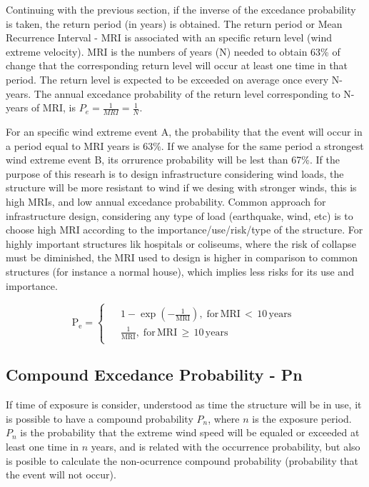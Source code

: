 \documentclass[12pt,twoside]{reedthesis}
\begin{document}
Continuing with the previous section, if the inverse of the excedance probability is taken, the return period (in years) is obtained. The return period or Mean Recurrence Interval - MRI is associated with an specific return level (wind extreme velocity). MRI is the numbers of years (N) needed to obtain 63\% of change that the corresponding return level will occur at least one time in that period. The return level is expected to be exceeded on average once every N-years. The annual excedance probability of the return level corresponding to N-years of MRI, is \(P_e=\frac{1}{MRI}=\frac{1}{N}\).

For an specific wind extreme event A, the probability that the event will occur in a period equal to MRI years is 63\%. If we analyse for the same period a strongest wind extreme event B, its orrurence probability will be lest than 67\%. If the purpose of this researh is to design infrastructure considering wind loads, the structure will be more resistant to wind if we desing with stronger winds, this is high MRIs, and low annual excedance probability. Common approach for infrastructure design, considering any type of load (earthquake, wind, etc) is to choose high MRI according to the importance/use/risk/type of the structure. For highly important structures lik hospitals or coliseums, where the risk of collapse must be diminished, the MRI used to design is higher in comparison to common structures (for instance a normal house), which implies less risks for its use and importance.

\[
  \mathrm{
    P_e = 
    \begin{cases}
      \begin{split}
            &1-\exp\left(-\frac{1}{MRI}\right),\;for\,MRI\,<\,10\,years
            \\
            &\frac{1}{MRI},\;for\,MRI\,\geq\,10\,years      
      \end{split}
    \end{cases}
  }
\]

\hypertarget{compound-excedance-probability---pn}{%
\subsection{Compound Excedance Probability - Pn}\label{compound-excedance-probability---pn}}

If time of exposure is consider, understood as time the structure will be in use, it is possible to have a compound probability \(P_n\), where \(n\) is the exposure period. \(P_n\) is the probability that the extreme wind speed will be equaled or exceeded at least one time in \(n\) years, and is related with the occurrence probability, but also is posible to calculate the non-ocurrence compound probability (probability that the event will not occur).
\end{document}
